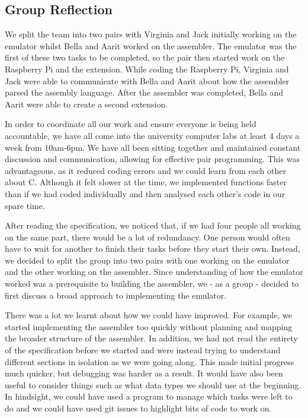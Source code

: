 \documentclass[11pt]{article}
\begin{document}
{}

\hypertarget{h.7uwhlvjrxtxq}{%
\subsection{\texorpdfstring{{Group
Reflection}}{Group Reflection}}\label{h.7uwhlvjrxtxq}}

{We split the team into two pairs with Virginia and Jack initially
working on the emulator whilst Bella and Aarit worked on the assembler.
The emulator was the first of these two tasks to be completed, so the
pair then started work on the Raspberry Pi and the extension. While
coding the Raspberry Pi, Virginia and Jack were able to communicate with
Bella and Aarit about how the assembler parsed the assembly language.
After the assembler was completed, Bella and Aarit were able to create a
second extension.}

{In order to coordinate all our work and ensure everyone is being held
accountable, we have all come into the university computer labs at least
4 days a week from 10am-6pm. We have all been sitting together and
maintained constant discussion and communication, allowing for effective
pair programming. This was advantageous, as it reduced coding errors and
we could learn from each other about C. Although it felt slower at the
time, we implemented functions faster than if we had coded individually
and then analysed each other's code in our spare time.}

{}

{After reading the specification, we noticed that, if we had four people
all working on the same part, there would be a lot of redundancy. One
person would often have to wait for another to finish their tasks before
they start their own. Instead, we decided to split the group into two
pairs with one working on the emulator and the other working on the
assembler. Since understanding of how the emulator worked was a
prerequisite to building the assembler, we - as a group - decided to
first discuss a broad approach to implementing the emulator.}

{There was a lot we learnt about how we could have improved. For
example, we started implementing the assembler too quickly without
planning and mapping the broader structure of the assembler. In
addition, we had not read the entirety of the specification before we
started and were instead trying to understand different sections in
isolation as we were going along. This made initial progress much
quicker, but debugging was harder as a result. It would have also been
useful to consider things such as what data types we should use at the
beginning. In hindsight, we could have used a program to manage which
tasks were left to do and we could have used git issues to highlight
bits of code to work on.}
\end{document}
